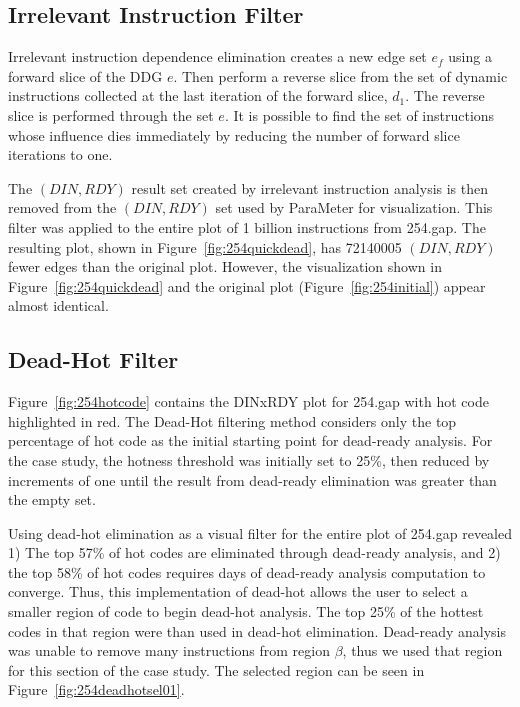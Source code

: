 {\subsection {Irrelevant Instruction Filter}

Irrelevant instruction dependence elimination creates a new edge set $e_f$ using a forward slice of the DDG $e$.  Then perform a reverse slice from the set of dynamic instructions collected at the last iteration of the forward slice, $d_1$.  The reverse slice is performed through the set $e$.  It is possible to find the set of instructions whose influence dies immediately by reducing the number of forward slice iterations to one.

The $(DIN,RDY)$ result set created by irrelevant instruction analysis is then removed from the $(DIN,RDY)$ set used by ParaMeter for visualization. This filter was applied to the entire plot of 1 billion instructions from 254.gap.  The resulting plot, shown in Figure~\ref{fig:254quickdead}, has 72140005 $(DIN,RDY)$ fewer edges than the original plot.  However, the visualization shown in Figure~\ref{fig:254quickdead} and the original plot (Figure~\ref{fig:254initial}) appear almost identical.

\subsection {Dead-Hot Filter}

Figure~\ref{fig:254hotcode} contains the DINxRDY plot for 254.gap with hot code highlighted in red.  The Dead-Hot filtering method considers only the top percentage of hot code as the initial starting point for dead-ready analysis. For the case study, the hotness threshold was initially set to 25\%, then reduced by increments of one until the result from dead-ready elimination was greater than the empty set.

Using dead-hot elimination as a visual filter for the entire plot of 254.gap revealed 1) The top 57\% of hot codes are eliminated through dead-ready analysis, and 2) the top 58\% of hot codes requires days of dead-ready analysis computation to converge.  Thus, this implementation of dead-hot allows the user to select a smaller region of code to begin dead-hot analysis.  The top 25\% of the hottest codes in that region were than used in dead-hot elimination.  Dead-ready analysis was unable to remove many instructions from region $\beta$, thus we used that region for this section of the case study.  The selected region can be seen in Figure~\ref{fig:254deadhotsel01}.

}
